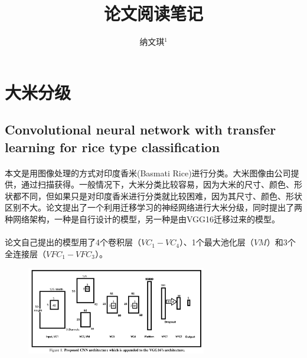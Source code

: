\documentclass[10pt,letterpaper]{article}
\begin{document}
 


\title{论文阅读笔记}

\author{纳文琪$^{1}$}

\maketitle


\section{大米分级}
\subsection{Convolutional neural network with transfer learning for rice type classification\cite{rice2018patel}}
\paragraph{} 本文是用图像处理的方式对印度香米(Basmati Rice)进行分类。大米图像由公司提供，通过扫描获得。一般情况下，大米分类比较容易，因为大米的尺寸、颜色、形状都不同，但如果只是对印度香米进行分类就比较困难，因为其尺寸、颜色、形状区别不大。论文提出了一个利用迁移学习的神经网络进行大米分级，同时提出了两种网络架构，一种是自行设计的模型，另一种是由VGG16迁移过来的模型。
\paragraph{} 论文自己提出的模型用了4个卷积层（$VC_1 - VC_4$）、1个最大池化层（$VM$）和3个全连接层（$VFC_1 - VFC_3$）。
\begin{figure}[H]
	\centering %
	\includegraphics[width=0.7\textwidth]{../images/patel_rice_model.png} %
	\caption{}
	\label{Fig.main2}
\end{figure}





\end{document}
